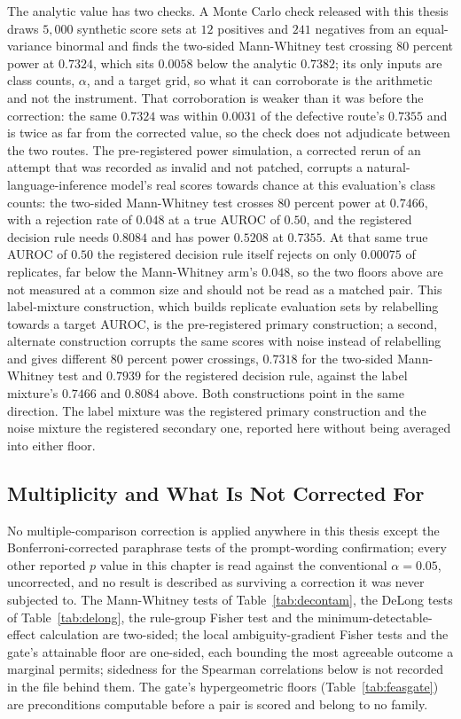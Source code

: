 The analytic value has two checks. A Monte Carlo check released with this
thesis draws $5{,}000$ synthetic score sets at $12$ positives and $241$
negatives from an equal-variance binormal and finds the two-sided Mann-Whitney
test crossing 80 percent power at $0.7324$, which sits $0.0058$ below the analytic $0.7382$; its only
inputs are class counts, $\alpha$, and a target grid, so what it can corroborate is the arithmetic and not
the instrument. That corroboration is weaker than it was before the correction: the same $0.7324$ was
within $0.0031$ of the defective route's $0.7355$ and is twice as far from the corrected value, so the
check does not adjudicate between the two routes. The pre-registered power
simulation, a corrected rerun of an attempt that was recorded as invalid and not
patched, corrupts a natural-language-inference model's real scores towards
chance at this evaluation's class counts: the two-sided Mann-Whitney test
crosses 80 percent power at $0.7466$, with a rejection rate of $0.048$ at a
true AUROC of $0.50$, and the registered decision rule needs $0.8084$ and has
power $0.5208$ at $0.7355$. At that same true AUROC of $0.50$ the registered
decision rule itself rejects on only $0.00075$ of replicates, far below the
Mann-Whitney arm's $0.048$, so the two floors above are not measured at a
common size and should not be read as a matched pair. This label-mixture
construction, which builds replicate evaluation sets by relabelling towards a
target AUROC, is the pre-registered primary construction; a second, alternate
construction corrupts the same scores with noise instead of relabelling and
gives different 80 percent power crossings, $0.7318$ for the two-sided
Mann-Whitney test and $0.7939$ for the registered decision rule, against the
label mixture's $0.7466$ and $0.8084$ above. Both constructions point in the same direction. The label mixture was the registered primary construction and the noise mixture the
registered secondary one, reported here without being averaged into either floor.

\subsection{Multiplicity and What Is Not Corrected For}
\label{sec:r-multiplicity}

No multiple-comparison correction is applied anywhere in this thesis except the Bonferroni-corrected paraphrase tests of the prompt-wording confirmation; every other reported $p$
value in this chapter is read against the conventional $\alpha = 0.05$, uncorrected, and no
result is described as surviving a correction it was never subjected to. The Mann-Whitney tests of Table~\ref{tab:decontam}, the DeLong tests of
Table~\ref{tab:delong}, the rule-group Fisher test and the minimum-detectable-effect
calculation are two-sided; the local ambiguity-gradient Fisher tests and the gate's
attainable floor are one-sided, each bounding the most agreeable outcome a marginal permits;
sidedness for the Spearman correlations below is not recorded in the file behind them. The
gate's hypergeometric floors (Table~\ref{tab:feasgate}) are preconditions computable before
a pair is scored and belong to no family.

